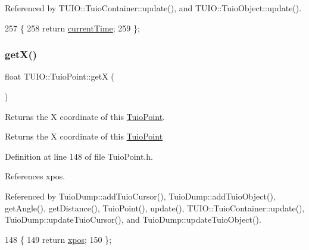 Referenced by T\+U\+I\+O\+::\+Tuio\+Container\+::update(), and T\+U\+I\+O\+::\+Tuio\+Object\+::update().


\begin{DoxyCode}
257                                \{ 
258             \textcolor{keywordflow}{return} \hyperlink{class_t_u_i_o_1_1_tuio_point_ad04658d52ab78e3e0ddc21584ceaa2ff}{currentTime};
259         \};
\end{DoxyCode}
\mbox{\label{class_t_u_i_o_1_1_tuio_point_ad5bb767c0a7b151704b59a38793345f0}} 
\subsubsection{\texorpdfstring{get\+X()}{getX()}}
{\footnotesize\ttfamily float T\+U\+I\+O\+::\+Tuio\+Point\+::getX (\begin{DoxyParamCaption}{ }\end{DoxyParamCaption})\hspace{0.3cm}{\ttfamily [inline]}}

Returns the X coordinate of this \hyperlink{class_t_u_i_o_1_1_tuio_point}{Tuio\+Point}. \begin{DoxyReturn}{Returns}
the X coordinate of this \hyperlink{class_t_u_i_o_1_1_tuio_point}{Tuio\+Point} 
\end{DoxyReturn}


Definition at line 148 of file Tuio\+Point.\+h.



References xpos.



Referenced by Tuio\+Dump\+::add\+Tuio\+Cursor(), Tuio\+Dump\+::add\+Tuio\+Object(), get\+Angle(), get\+Distance(), Tuio\+Point(), update(), T\+U\+I\+O\+::\+Tuio\+Container\+::update(), Tuio\+Dump\+::update\+Tuio\+Cursor(), and Tuio\+Dump\+::update\+Tuio\+Object().


\begin{DoxyCode}
148                      \{ 
149             \textcolor{keywordflow}{return} \hyperlink{class_t_u_i_o_1_1_tuio_point_a0021f8dfddd05f2a17e713a94f5457e6}{xpos};
150         \};
\end{DoxyCode}
\mbox{\label{class_t_u_i_o_1_1_tuio_point_a6c591de33c3c0f0d5e8df159ce643b7a}} 
